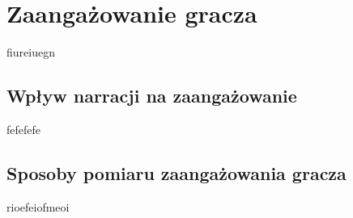 \chapter{Zaangażowanie gracza}\label{chapter:ch3}

fiureiuegn

\section{Wpływ narracji na zaangażowanie}\label{section:ch3_1}

fefefefe

\section{Sposoby pomiaru zaangażowania gracza}\label{section:ch3_2}

rioefeiofmeoi
